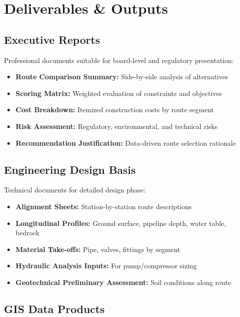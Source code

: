 \documentclass[11pt,letterpaper]{article}
\begin{document}
\newpage

\section{Deliverables \& Outputs}

\subsection{Executive Reports}

Professional documents suitable for board-level and regulatory presentation:

\begin{itemize}[leftmargin=*]
    \item \textbf{Route Comparison Summary:} Side-by-side analysis of alternatives
    \item \textbf{Scoring Matrix:} Weighted evaluation of constraints and objectives
    \item \textbf{Cost Breakdown:} Itemized construction costs by route segment
    \item \textbf{Risk Assessment:} Regulatory, environmental, and technical risks
    \item \textbf{Recommendation Justification:} Data-driven route selection rationale
\end{itemize}

\subsection{Engineering Design Basis}

Technical documents for detailed design phase:

\begin{itemize}[leftmargin=*]
    \item \textbf{Alignment Sheets:} Station-by-station route descriptions
    \item \textbf{Longitudinal Profiles:} Ground surface, pipeline depth, water table, bedrock
    \item \textbf{Material Take-offs:} Pipe, valves, fittings by segment
    \item \textbf{Hydraulic Analysis Inputs:} For pump/compressor sizing
    \item \textbf{Geotechnical Preliminary Assessment:} Soil conditions along route
\end{itemize}

\subsection{GIS Data Products}
\end{document}
